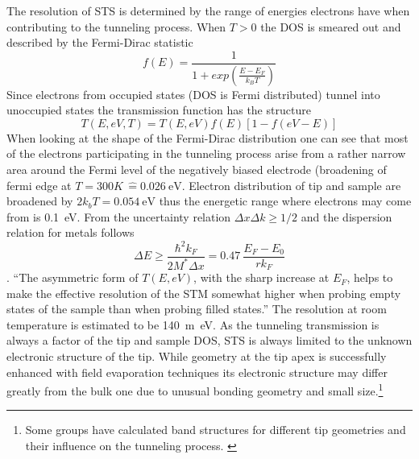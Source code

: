 The resolution of STS is determined by the range of energies electrons have when contributing to the tunneling process. When $T>0$ the DOS is smeared out and described by the Fermi-Dirac statistic\cite{fermi_zur_1926, dirac_theory_1926} $$f(E)=\frac{1}{1+exp\left(\frac{E-E_F}{k_BT}\right)}$$ 
Since electrons from occupied states (DOS is Fermi distributed) tunnel into unoccupied states the transmission function has the structure $$T(E,eV,T)=T(E,eV)f(E)[1-f(eV-E)]$$ 
When looking at the shape of the Fermi-Dirac distribution one can see that most of the electrons participating in the tunneling process arise from a rather narrow area around the Fermi level of the negatively biased electrode (broadening of fermi edge at $T=300K\,\hat=\SI{0.026}{\eV}$. Electron distribution of tip and sample are broadened by $2 k_b T=\SI{0.054}{\eV}$ thus the energetic range where electrons may come from is \SI{0.1}{\eV}. From the uncertainty relation $\Delta x \Delta k \geq 1/2$ and the dispersion relation for metals follows $$ \Delta E\ge \frac{\hbar^2k_F}{2M^*\Delta x}=0.47\ \frac{E_F-E_0}{rk_F} $$\cite{chen_introduction_2008}. ``The asymmetric form of $T(E,eV)$, with the sharp increase at $E_F$, helps to make the effective resolution of the STM somewhat higher when probing empty states of the sample than when probing filled states.''
The resolution at room temperature is estimated to be \SI{140}{\m\eV}\cite{hansma_tunneling_1982}.
As the tunneling transmission is always a factor of the tip and sample DOS, STS is always limited to the unknown electronic structure of the tip. While geometry at the tip apex is successfully enhanced with field evaporation techniques its electronic structure may differ greatly from the bulk one due to unusual bonding geometry and small size.\footnote{ Some\cite{tersoff_role_1990,ciraci_tip-sample_1990,lawunmi_theoretical_1990,kobayashi_simulation_1990} groups have calculated band structures for different tip geometries and their influence on the tunneling process. \label{section:AFM-resolution}}